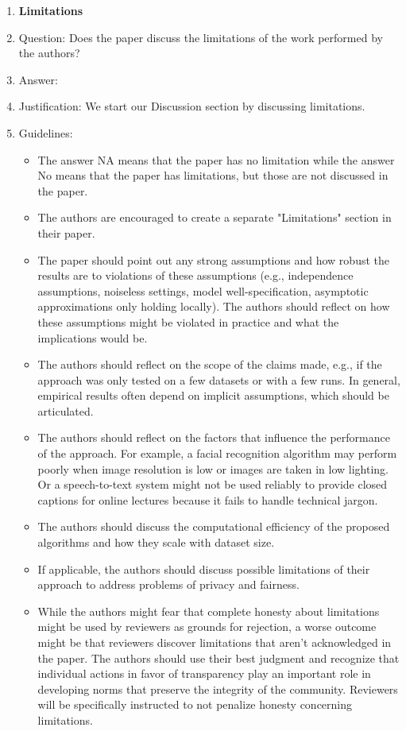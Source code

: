 \documentclass{article}
\begin{document}
\begin{enumerate}
\item {\bf Limitations}
    \item[] Question: Does the paper discuss the limitations of the work performed by the authors?
    \item[] Answer: \answerYes{} %
    \item[] Justification: We start our Discussion section by discussing limitations.
    \item[] Guidelines:
    \begin{itemize}
        \item The answer NA means that the paper has no limitation while the answer No means that the paper has limitations, but those are not discussed in the paper. 
        \item The authors are encouraged to create a separate "Limitations" section in their paper.
        \item The paper should point out any strong assumptions and how robust the results are to violations of these assumptions (e.g., independence assumptions, noiseless settings, model well-specification, asymptotic approximations only holding locally). The authors should reflect on how these assumptions might be violated in practice and what the implications would be.
        \item The authors should reflect on the scope of the claims made, e.g., if the approach was only tested on a few datasets or with a few runs. In general, empirical results often depend on implicit assumptions, which should be articulated.
        \item The authors should reflect on the factors that influence the performance of the approach. For example, a facial recognition algorithm may perform poorly when image resolution is low or images are taken in low lighting. Or a speech-to-text system might not be used reliably to provide closed captions for online lectures because it fails to handle technical jargon.
        \item The authors should discuss the computational efficiency of the proposed algorithms and how they scale with dataset size.
        \item If applicable, the authors should discuss possible limitations of their approach to address problems of privacy and fairness.
        \item While the authors might fear that complete honesty about limitations might be used by reviewers as grounds for rejection, a worse outcome might be that reviewers discover limitations that aren't acknowledged in the paper. The authors should use their best judgment and recognize that individual actions in favor of transparency play an important role in developing norms that preserve the integrity of the community. Reviewers will be specifically instructed to not penalize honesty concerning limitations.
    \end{itemize}


\end{enumerate}
\end{document}
